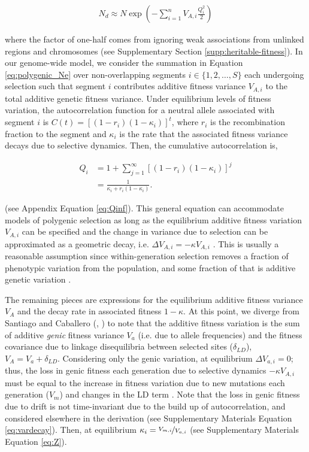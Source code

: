 \documentclass[11pt]{article}
\begin{document}
\begin{align}
    \label{eq:polygenic_Ne}
    N_d \approx N \exp\left(-\sum_{i=1}^n V_{A,i} \frac{Q_i^2}{2}\right)
\end{align}

where the factor of one-half comes from ignoring weak associations from
unlinked regions and chromosomes (see Supplementary Section
\ref{supp:heritable-fitness}). In our genome-wide model, we consider the
summation in Equation \eqref{eq:polygenic_Ne} over non-overlapping segments $i
\in \{1, 2, \ldots, S\}$ each undergoing selection such that segment $i$
contributes additive fitness variance $V_{A,i}$ to the total additive genetic
fitness variance. Under equilibrium levels of fitness variation, the
autocorrelation function for a neutral allele associated with segment $i$ is
$C(t) = [(1-r_i)(1-\kappa_i)]^t$, where $r_i$ is the recombination fraction to
the segment and $\kappa_i$ is the rate that the associated fitness variance
decays due to selective dynamics. Then, the cumulative autocorrelation is,

\begin{align}
    \label{eq:Q}
    Q_i &= 1 + \sum_{j=1}^\infty \left[(1-r_i)(1-\kappa_i)\right]^j \nonumber \\
        &= \frac{1}{\kappa_i + r_i(1-\kappa_i)}.
\end{align}

(see Appendix Equation \ref{eq:Qinf}). This general equation can accommodate
models of polygenic selection as long as the equilibrium additive fitness
variation $V_{A,i}$ can be specified and the change in variance due to
selection can be approximated as a geometric decay, i.e. $\Delta V_{A,i} =
-\kappa V_{A,i}$ \parencite{Bulmer1971-ae,Keightley1988-eq,Walsh2018-bt}. This
is usually a reasonable assumption since within-generation selection removes a
fraction of phenotypic variation from the population, and some fraction of that
is additive genetic variation \parencite{Bulmer1971-ae,Keightley1988-eq}.

The remaining pieces are expressions for the equilibrium additive fitness
variance $V_A$ and the decay rate in associated fitness $1-\kappa$. At this
point, we diverge from Santiago and Caballero (\citeyear{Santiago1998-bs},
\citeyear{Santiago2016-mu}) to note that the additive fitness variation is the
sum of additive \emph{genic} fitness variance $V_a$ (i.e. due to allele
frequencies) and the fitness covariance due to linkage disequilibria between
selected sites ($\delta_{LD}$), $V_A = V_a + \delta_{LD}$. Considering only the
genic variation, at equilibrium $\Delta V_{a,i} = 0$; thus, the loss in genic
fitness each generation due to selective dynamics $-\kappa V_{A,i}$ must be
equal to the increase in fitness variation due to new mutations each generation
($V_m$) and changes in the LD term \parencite{Bulmer1971-ae}. Note that the
loss in genic fitness due to drift is not time-invariant due to the build up of
autocorrelation, and considered elsewhere in the derivation (see Supplementary
Materials Equation \ref{eq:vardecay}). Then, at equilibrium $\kappa_i =
\nicefrac{V_{m,i}}{V_{a,i}}$ (see Supplementary Materials Equation \ref{eq:Z}). 
\end{document}
